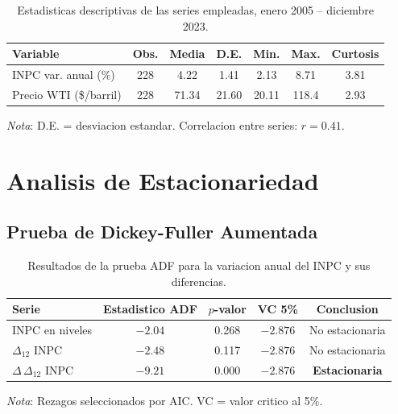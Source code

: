 \documentclass[12pt,a4paper]{article}
\begin{document}
\begin{table}[H]
  \centering
  \caption{Estadisticas descriptivas de las series empleadas, enero 2005 -- diciembre 2023.}
  \label{tab:estadisticas2}
  \begin{tabular}{lcccccc}
    \toprule
    \textbf{Variable} & \textbf{Obs.} & \textbf{Media} & \textbf{D.E.} & \textbf{Min.} & \textbf{Max.} & \textbf{Curtosis} \\
    \midrule
    INPC var. anual (\%)   & 228 &  4.22 &  1.41 &  2.13 &  8.71 & 3.81 \\
    Precio WTI (\$/barril) & 228 & 71.34 & 21.60 & 20.11 & 118.4 & 2.93 \\
    \bottomrule
  \end{tabular}
  \begin{tablenotes}
    \small\item \textit{Nota}: D.E. = desviacion estandar. Correlacion entre series: $r = 0.41$.
  \end{tablenotes}
\end{table}

\section{Analisis de Estacionariedad}

\subsection{Prueba de Dickey-Fuller Aumentada}

\begin{table}[H]
  \centering
  \caption{Resultados de la prueba ADF para la variacion anual del INPC y sus diferencias.}
  \label{tab:adf2}
  \begin{tabular}{lcccc}
    \toprule
    \textbf{Serie} & \textbf{Estadistico ADF} & \textbf{$p$-valor} & \textbf{VC 5\%} & \textbf{Conclusion} \\
    \midrule
    INPC en niveles            & $-2.04$ & 0.268 & $-2.876$ & No estacionaria \\
    $\Delta_{12}$ INPC         & $-2.48$ & 0.117 & $-2.876$ & No estacionaria \\
    $\Delta\,\Delta_{12}$ INPC & $-9.21$ & 0.000 & $-2.876$ & \textbf{Estacionaria} \\
    \bottomrule
  \end{tabular}
  \begin{tablenotes}
    \small\item \textit{Nota}: Rezagos seleccionados por AIC. VC = valor critico al 5\%.
  \end{tablenotes}
\end{table}
\end{document}
